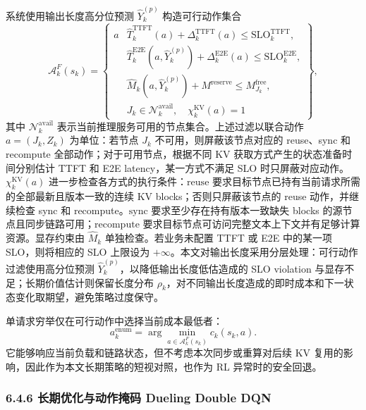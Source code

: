 系统使用输出长度高分位预测 \(\widehat Y_k^{(p)}\) 构造可行动作集合
\[
\mathcal A_k^F(s_k)
=
\left\{
\begin{array}{l|l}
a &
\widehat T_k^{\mathrm{TTFT}}(a)
+\Delta_k^{\mathrm{TTFT}}(a)\le \mathrm{SLO}_k^{\mathrm{TTFT}},\\
&
\widehat T_k^{\mathrm{E2E}}(a,\widehat Y_k^{(p)})
+\Delta_k^{\mathrm{E2E}}(a)\le \mathrm{SLO}_k^{\mathrm{E2E}},\\
& \widehat M_k(a,\widehat Y_k^{(p)})+M^{\mathrm{reserve}}
\le M_{J_k}^{\mathrm{free}},\\
& J_k\in\mathcal N_k^{\mathrm{avail}},\quad
\chi_k^{\mathrm{KV}}(a)=1
\end{array}
\right\},
\]
其中 \(\mathcal N_k^{\mathrm{avail}}\) 表示当前推理服务可用的节点集合。上述过滤以联合动作 \(a=(J_k,Z_k)\) 为单位：若节点 \(J_k\) 不可用，则屏蔽该节点对应的 reuse、sync 和 recompute 全部动作；对于可用节点，根据不同 KV 获取方式产生的状态准备时间分别估计 TTFT 和 E2E latency，某一方式不满足 SLO 时只屏蔽对应动作。\(\chi_k^{\mathrm{KV}}(a)\) 进一步检查各方式的执行条件：\(\mathrm{reuse}\) 要求目标节点已持有当前请求所需的全部最新且版本一致的连续 KV blocks；否则只屏蔽该节点的 reuse 动作，并继续检查 sync 和 recompute。\(\mathrm{sync}\) 要求至少存在持有版本一致缺失 blocks 的源节点且同步链路可用；\(\mathrm{recompute}\) 要求目标节点可访问完整文本上下文并有足够计算资源。显存约束由 \(\widehat M_k\) 单独检查。若业务未配置 TTFT 或 E2E 中的某一项 SLO，则将相应的 SLO 上限设为 \(+\infty\)。本文对输出长度采用分层处理：可行动作过滤使用高分位预测 \(\widehat Y_k^{(p)}\)，以降低输出长度低估造成的 SLO violation 与显存不足；长期价值估计则保留长度分布 \(\rho_k\)，对不同输出长度造成的即时成本和下一状态变化取期望，避免策略过度保守。

单请求穷举仅在可行动作中选择当前成本最低者：
\[
a_k^{\mathrm{enum}}
=
\arg\min_{a\in\mathcal A_k^F(s_k)}c_k(s_k,a).
\]
它能够响应当前负载和链路状态，但不考虑本次同步或重算对后续 KV 复用的影响，因此作为本文长期策略的短视对照，也作为 RL 异常时的安全回退。

\subsubsection*{6.4.6 长期优化与动作掩码 Dueling Double DQN}

